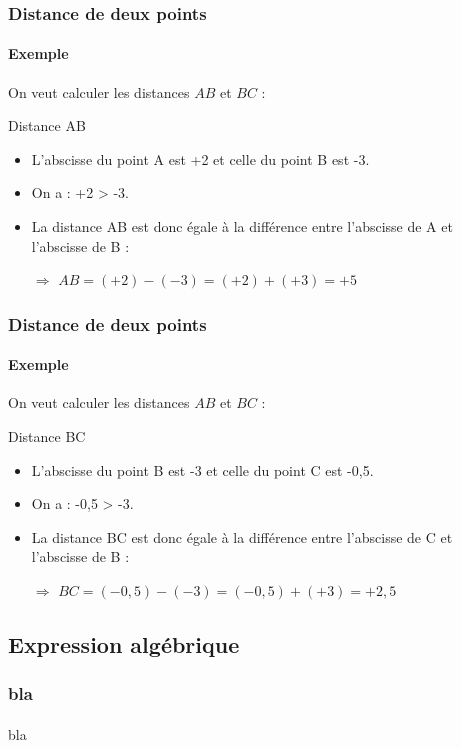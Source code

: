 \documentclass{beamer}
\begin{document}
\begin{frame}
	\frametitle{Distance de deux points}  
	\framesubtitle{Exemple}	
	
	On veut calculer les distances $AB$ et $BC$ :
	\pause

	\begin{exampleblock}{Distance AB}
				
		\begin{itemize}
			\item L'abscisse du point A est +2 et celle du point B est -3.
			\item On a : +2 > -3.
			\item La distance AB est donc égale à la différence entre l'abscisse de A et l'abscisse de B :
			\item[$\Rightarrow $] $AB = (+2) - (-3) = (+2) + (+3) = +5$
		\end{itemize}
	\end{exampleblock}
		
\end{frame}

\begin{frame}
	\frametitle{Distance de deux points}  
	\framesubtitle{Exemple}	
	
	On veut calculer les distances $AB$ et $BC$ :
	

	\begin{exampleblock}{Distance BC}
		
		\begin{itemize}
			\item L'abscisse du point B est -3 et celle du point C est -0,5.
			\item On a : -0,5 > -3.
			\item La distance BC est donc égale à la différence entre l'abscisse de C et l'abscisse de B :
			\item[$\Rightarrow $] $BC = (-0,5) - (-3) = (-0,5) + (+3) = +2,5$
		\end{itemize}
	\end{exampleblock}
\end{frame}

\subsection{Expression algébrique}

\begin{frame}
	\frametitle{bla}  
	\framesubtitle{}	
	
	bla
\end{frame}
\end{document}

